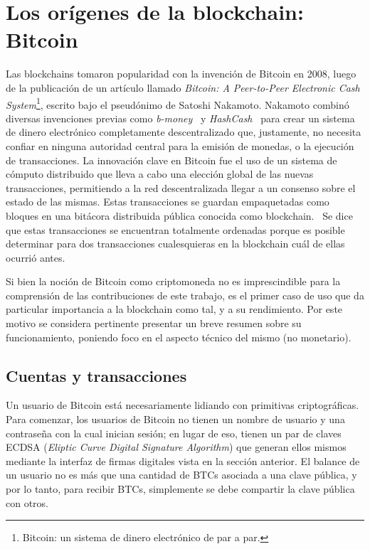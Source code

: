 \section{Los orígenes de la blockchain: Bitcoin}
Las blockchains tomaron popularidad con la invención de Bitcoin en 2008, luego de la publicación
de un artículo llamado \textit{Bitcoin: A Peer-to-Peer
Electronic Cash System}\footnote{Bitcoin: un sistema de dinero electrónico de par a par.}, escrito
bajo el pseudónimo de Satoshi Nakamoto.
Nakamoto combinó diversas invenciones previas como
\textit{b-money}~\cite{b.money} y \textit{HashCash}~\cite{hashcash} para crear un sistema de dinero electrónico completamente
descentralizado que, justamente, no necesita confiar en ninguna autoridad central para la emisión de monedas,
o la ejecución de transacciones. 
La innovación clave en Bitcoin fue el uso de un sistema de cómputo distribuido que lleva
a cabo una elección global de las nuevas transacciones, permitiendo
a la red descentralizada llegar a un consenso sobre el estado de las mismas. Estas transacciones
se guardan empaquetadas como bloques en una bitácora distribuida pública conocida como blockchain.~\cite{mastering.bitcoin}
%
Se dice que estas transacciones se encuentran totalmente ordenadas porque es posible determinar para
dos transacciones cualesquieras en la blockchain cuál de ellas ocurrió antes.


%
Si bien la noción de Bitcoin como criptomoneda no es imprescindible para la comprensión de las
contribuciones de este trabajo, es el primer caso de uso que da particular importancia a la blockchain
como tal, y a su rendimiento. Por este motivo se considera pertinente presentar un breve resumen sobre
su funcionamiento, poniendo foco en el aspecto técnico del mismo (no monetario).

\subsection{Cuentas y transacciones}

Un usuario de Bitcoin está necesariamente lidiando con primitivas criptográficas.
%
Para comenzar, los usuarios de Bitcoin no tienen un nombre de usuario y una contraseña
con la cual inician sesión; en lugar de eso, tienen un par de claves ECDSA (\textit{Eliptic
Curve Digital Signature Algorithm}) que generan ellos mismos mediante la interfaz de firmas
digitales vista en la sección anterior.
%
El balance de un usuario no es más que una cantidad de BTCs asociada a una clave pública,
y por lo tanto, para recibir BTCs, simplemente se debe compartir la clave pública con otros.

